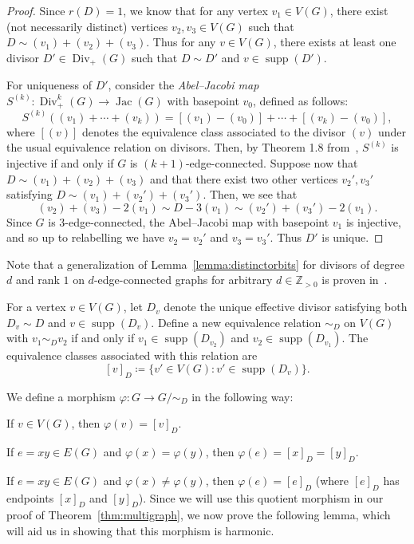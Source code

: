 \documentclass[10pt]{amsart}
\renewenvironment{enumerate}[1][]{\if\relax\detokenize{#1}\relax\sourceenumerate\else\sourceenumerate[label=#1]\fi}{\endsourceenumerate}
\DeclareMathOperator{\Div}{Div}
\DeclareMathOperator{\supp}{supp}
\DeclareMathOperator{\Jac}{Jac}
\begin{document}
\begin{proof}
Since $r(D)=1$, we know that for any vertex $v_1\in V(G)$, there exist (not necessarily distinct) vertices $v_2, v_3 \in V(G)$ such that $D \sim (v_1) + (v_2) + (v_3)$. Thus for any $v\in V(G)$, there exists at least one divisor $D' \in \Div _+(G)$ such that $D \sim D'$ and $v \in \supp (D')$.

For uniqueness of $D'$, consider the \emph{Abel--Jacobi map} $S^{(k)} : \Div _+^k(G) \to \Jac (G)$ with basepoint $v_0$, defined as follows:
\[
S^{(k)}((v_1) + \cdots + (v_k)) = [(v_1) - (v_0)] + \cdots + [(v_k) - (v_0)],
\]
where $[(v)]$ denotes the equivalence class associated to the divisor $(v)$ under the usual equivalence relation on divisors. Then, by Theorem 1.8 from~\cite{bn}, $S^{(k)}$ is injective if and only if $G$ is $(k+1)$-edge-connected. Suppose now that $D \sim (v_1) + (v_2) + (v_3)$ and that there exist two other vertices $v_2', v_3'$ satisfying $D \sim (v_1) + (v_2') + (v_3')$. Then, we see that
\[
(v_2) + (v_3) - 2(v_1) \sim D - 3(v_1) \sim (v_2') + (v_3') - 2(v_1).
\]
Since $G$ is $3$-edge-connected, the Abel--Jacobi map with basepoint $v_1$ is injective, and so up to relabelling we have $v_2 = v_2'$ and $v_3 = v_3'$. Thus $D'$ is unique.
\end{proof}

Note that a generalization of Lemma~\ref{lemma:distinctorbits} for divisors of degree $d$ and rank $1$ on $d$-edge-connected graphs for arbitrary $d \in \mathbb{Z}_{>0}$ is proven in~\cite{cp}. 

For a vertex $v \in V(G)$, let $D_v$ denote the unique effective divisor satisfying both $D_v \sim D$ and $v \in \supp (D_v)$. Define a new equivalence relation $\sim_D$ on $V(G)$ with $v_1 \sim_D v_2$ if and only if $v_1 \in \supp (D_{v_2})$ and $v_2 \in \supp (D_{v_1})$. The equivalence classes associated with this relation are
\[
[v]_D \coloneqq \{ v' \in V(G) : v' \in \supp (D_v) \}.
\]

We define a morphism $\varphi: G \to G / \sim_D$ in the following way:

\begin{enumerate}[(\roman*)]
 \item If $v \in V(G)$, then $\varphi(v) = [v]_D$.
 \item If $e = xy \in E(G)$ and $\varphi(x) = \varphi(y)$, then $\varphi(e) = [x]_D = [y]_D$.
 \item If $e = xy \in E(G)$ and $\varphi(x) \neq \varphi(y)$, then $\varphi(e) = [e]_D$ (where $[e]_D$ has endpoints $[x]_D$ and $[y]_D$).
\end{enumerate}
Since we will use this quotient morphism in our proof of Theorem~\ref{thm:multigraph}, we now prove the following lemma, which will aid us in showing that this morphism is harmonic.
\end{document}
